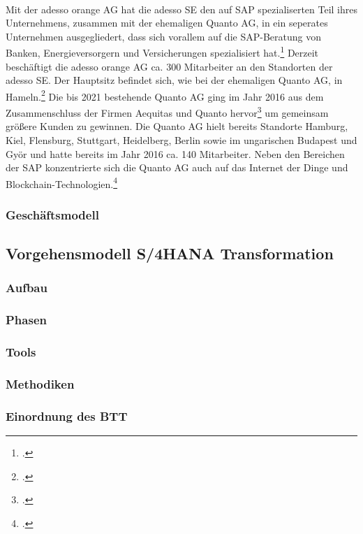 \\Mit der adesso orange AG hat die adesso SE den auf SAP spezialiserten Teil ihres Unternehmens, zusammen mit der ehemaligen Quanto AG, in ein seperates Unternehmen ausgegliedert, dass sich vorallem auf die SAP-Beratung von Banken, Energieversorgern und Versicherungen spezialisiert hat.\footcite[Vgl.][]{ao-main} Derzeit beschäftigt die adesso orange AG ca. 300 Mitarbeiter an den Standorten der adesso SE. Der Hauptsitz befindet sich, wie bei der ehemaligen Quanto AG, in Hameln.\footcite[Vgl.][]{ao-karriere}
Die bis 2021 bestehende Quanto AG ging im Jahr 2016 aus dem Zusammenschluss der Firmen \glqq{}Aequitas\grqq{} und \glqq{}Quanto\grqq{} hervor\footcite[Vgl.][]{ww-quanto} um gemeinsam größere Kunden zu gewinnen. Die Quanto AG hielt bereits Standorte Hamburg, Kiel, Flensburg, Stuttgart, Heidelberg, Berlin sowie im ungarischen Budapest und Györ und hatte bereits im Jahr 2016 ca. 140 Mitarbeiter. Neben den Bereichen der SAP konzentrierte sich die Quanto AG auch auf das \glqq{}Internet der Dinge\grqq{} und Blockchain-Technologien.\footcite[Vgl.][]{ww-quanto}

\subsubsection{Geschäftsmodell}

\subsection{Vorgehensmodell S/4HANA Transformation}
\subsubsection{Aufbau}

\subsubsection{Phasen}

\subsubsection{Tools}

\subsubsection{Methodiken}

\subsubsection{Einordnung des BTT}